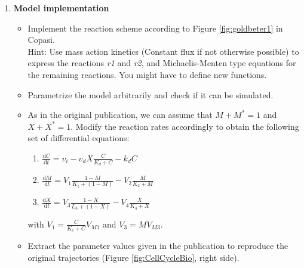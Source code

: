 \documentclass[a4paper,11pt,twoside]{article}
\begin{document}
\begin{enumerate}
\item \textbf{Model implementation}

\begin{itemize}
 \item Implement the reaction scheme according to Figure \ref{fig:goldbeter1} in Copasi. \\
Hint: Use mass action kinetics (Constant flux if not otherwise possible) to express the reactions \textit{r1} and \textit{r2}, and Michaelis-Menten type equations for the remaining reactions. You might have to define new functions.
 \item Parametrize the model arbitrarily and check if it can be simulated.	
 \item As in the original publication, we can assume that $M+M^*=1$ and $X+X^*=1$. Modify the reaction rates accordingly to obtain the following set of differential equations:
 \begin{enumerate}
 \item $\frac{\mathrm{d}C}{\mathrm{d}t}=v_i-v_dX\frac{C}{K_d+C}-k_dC$
 \item $\frac{\mathrm{d}M}{\mathrm{d}t}=V_1\frac{1-M}{K_1+(1-M)}-V_2\frac{M}{K_2+M}$
 \item $\frac{\mathrm{d}X}{\mathrm{d}t}=V_3\frac{1-X}{L_3+(1-X)}-V_4\frac{X}{K_4+X}$
 \end{enumerate}
 with $V_1=\frac{C}{K_c+C}V_{M1}$ and $V_3=MV_{M3}$.
 \item Extract the parameter values given in the publication to reproduce the original trajectories (Figure \ref{fig:CellCycleBio}, right side).
\end{itemize}



\end{enumerate}
\end{document}
